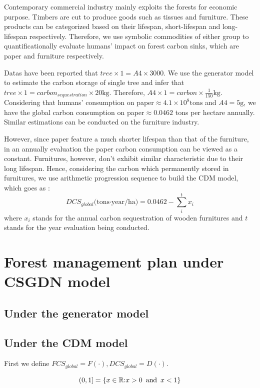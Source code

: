 \documentclass[12pt]{article}
\begin{document}
Contemporary commercial industry mainly exploits the forests for economic purpose. Timbers are cut to produce goods such as tissues and furniture. These products can be categorized based on their lifespan, short-lifespan and long-lifespan respectively. Therefore, we use symbolic commodities of either group to quantificationally evaluate humans' impact on forest carbon sinks, which are paper and furniture respectively.

Datas have been reported that $tree\times1 = A4\times 3000$. We use the generator model to estimate the carbon storage of single tree and infer that $tree\times 1=carbon_{sequestration}\times20 \text{kg} $. Therefore, $A4\times 1 =carbon\times \frac{1}{150} \text{kg}$. Considering that humans' consumption on paper$\approx 4.1\times10^8 \text{tons}$ and $A4=5\text{g}$, we have the global carbon consumption on paper$\approx 0.0462$ tons per hectare annually. Similar
estimations can be conducted on the furniture industry.

However, since paper feature a much shorter lifespan than that of the furniture, in an annually evaluation the paper carbon consumption can be viewed as a constant. Furnitures, however, don't exhibit similar characteristic due to their long lifespan. Hence, considering the carbon which permanently stored in furnitures, we use arithmetic progression sequence to build the CDM model, which goes as :
\begin{equation}
	DCS_{global}\text{(tons·year/ha)} = 0.0462 - \sum_{i}^{t}x_i 
\end{equation}
where $x_i$ stands for the annual carbon sequestration of wooden furnitures and $t$ stands for the year evaluation being conducted. 
\section{Forest management plan under CSGDN model}
\subsection{Under the generator model}

\subsection{Under the CDM model}
\hspace{2em} First we define $FCS_{global} = F(\cdot), DCS_{global} = D(\cdot)$. 

\begin{equation}
	(0,1]=\{x\in \mathbb{R}\text{:}x>0\hspace{0.5em} \text{and}\hspace{0.5em} x<1\}
\end{equation}
\end{document}
